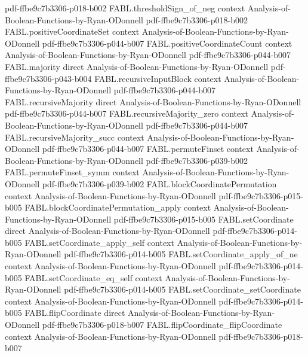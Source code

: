 \begin{theorem}
  {pdf-ffbe9c7b3306-p018-b002}
\proofstep
  {FABL.thresholdSign_of_neg}
  {context}
  {Analysis-of-Boolean-Functions-by-Ryan-ODonnell}
  {pdf-ffbe9c7b3306-p018-b002}
\proofstep
  {FABL.positiveCoordinateSet}
  {context}
  {Analysis-of-Boolean-Functions-by-Ryan-ODonnell}
  {pdf-ffbe9c7b3306-p044-b007}
\proofstep
  {FABL.positiveCoordinateCount}
  {context}
  {Analysis-of-Boolean-Functions-by-Ryan-ODonnell}
  {pdf-ffbe9c7b3306-p044-b007}
\proofstep
  {FABL.majority}
  {direct}
  {Analysis-of-Boolean-Functions-by-Ryan-ODonnell}
  {pdf-ffbe9c7b3306-p043-b004}
\proofstep
  {FABL.recursiveInputBlock}
  {context}
  {Analysis-of-Boolean-Functions-by-Ryan-ODonnell}
  {pdf-ffbe9c7b3306-p044-b007}
\proofstep
  {FABL.recursiveMajority}
  {direct}
  {Analysis-of-Boolean-Functions-by-Ryan-ODonnell}
  {pdf-ffbe9c7b3306-p044-b007}
\proofstep
  {FABL.recursiveMajority_zero}
  {context}
  {Analysis-of-Boolean-Functions-by-Ryan-ODonnell}
  {pdf-ffbe9c7b3306-p044-b007}
\proofstep
  {FABL.recursiveMajority_succ}
  {context}
  {Analysis-of-Boolean-Functions-by-Ryan-ODonnell}
  {pdf-ffbe9c7b3306-p044-b007}
\proofstep
  {FABL.permuteFinset}
  {context}
  {Analysis-of-Boolean-Functions-by-Ryan-ODonnell}
  {pdf-ffbe9c7b3306-p039-b002}
\proofstep
  {FABL.permuteFinset_symm}
  {context}
  {Analysis-of-Boolean-Functions-by-Ryan-ODonnell}
  {pdf-ffbe9c7b3306-p039-b002}
\proofstep
  {FABL.blockCoordinatePermutation}
  {context}
  {Analysis-of-Boolean-Functions-by-Ryan-ODonnell}
  {pdf-ffbe9c7b3306-p015-b005}
\proofstep
  {FABL.blockCoordinatePermutation_apply}
  {context}
  {Analysis-of-Boolean-Functions-by-Ryan-ODonnell}
  {pdf-ffbe9c7b3306-p015-b005}
\proofstep
  {FABL.setCoordinate}
  {direct}
  {Analysis-of-Boolean-Functions-by-Ryan-ODonnell}
  {pdf-ffbe9c7b3306-p014-b005}
\proofstep
  {FABL.setCoordinate_apply_self}
  {context}
  {Analysis-of-Boolean-Functions-by-Ryan-ODonnell}
  {pdf-ffbe9c7b3306-p014-b005}
\proofstep
  {FABL.setCoordinate_apply_of_ne}
  {context}
  {Analysis-of-Boolean-Functions-by-Ryan-ODonnell}
  {pdf-ffbe9c7b3306-p014-b005}
\proofstep
  {FABL.setCoordinate_eq_self}
  {context}
  {Analysis-of-Boolean-Functions-by-Ryan-ODonnell}
  {pdf-ffbe9c7b3306-p014-b005}
\proofstep
  {FABL.setCoordinate_setCoordinate}
  {context}
  {Analysis-of-Boolean-Functions-by-Ryan-ODonnell}
  {pdf-ffbe9c7b3306-p014-b005}
\proofstep
  {FABL.flipCoordinate}
  {direct}
  {Analysis-of-Boolean-Functions-by-Ryan-ODonnell}
  {pdf-ffbe9c7b3306-p018-b007}
\proofstep
  {FABL.flipCoordinate_flipCoordinate}
  {context}
  {Analysis-of-Boolean-Functions-by-Ryan-ODonnell}
  {pdf-ffbe9c7b3306-p018-b007}

\end{theorem}
